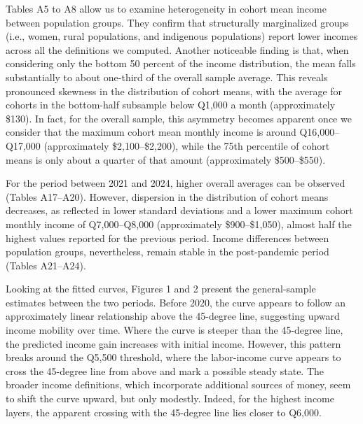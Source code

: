 \documentclass{article}
\begin{document}
Tables A5 to A8 allow us to examine heterogeneity in cohort mean income between population groups. They confirm that structurally marginalized groups (i.e., women, rural populations, and indigenous populations) report lower incomes across all the definitions we computed. Another noticeable finding is that, when considering only the bottom 50 percent of the income distribution, the mean falls substantially to about one-third of the overall sample average. This reveals pronounced skewness in the distribution of cohort means, with the average for cohorts in the bottom-half subsample below Q1,000 a month (approximately \$130). In fact, for the overall sample, this asymmetry becomes apparent once we consider that the maximum cohort mean monthly income is around Q16,000--Q17,000 (approximately \$2,100--\$2,200), while the 75th percentile of cohort means is only about a quarter of that amount (approximately \$500--\$550).

For the period between 2021 and 2024, higher overall averages can be observed (Tables A17--A20). However, dispersion in the distribution of cohort means decreases, as reflected in lower standard deviations and a lower maximum cohort monthly income of Q7,000--Q8,000 (approximately \$900--\$1,050), almost half the highest values reported for the previous period. Income differences between population groups, nevertheless, remain stable in the post-pandemic period (Tables A21--A24).

Looking at the fitted curves, Figures 1 and 2 present the general-sample estimates between the two periods. Before 2020, the curve appears to follow an approximately linear relationship above the 45-degree line, suggesting upward income mobility over time. Where the curve is steeper than the 45-degree line, the predicted income gain increases with initial income. However, this pattern breaks around the Q5,500 threshold, where the labor-income curve appears to cross the 45-degree line from above and mark a possible steady state. The broader income definitions, which incorporate additional sources of money, seem to shift the curve upward, but only modestly. Indeed, for the highest income layers, the apparent crossing with the 45-degree line lies closer to Q6,000.
\end{document}
